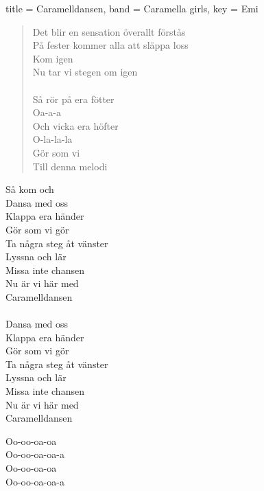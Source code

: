 \begin{song}[
	remember-chords = false ,
	verse/numbered = true ,
	transpose-capo = true 
	]{
		title = Caramelldansen,
		band = Caramella girls,
		key  = Emi
	}
\begin{verse}
		Det blir en sensation överallt förstås \\
		På fester kommer alla att släppa loss \\
		Kom igen \\
		Nu tar vi stegen om igen \\
		\\
		Så rör på era fötter \\
		Oa-a-a \\
		Och vicka era höfter \\
		O-la-la-la \\
		Gör som vi \\
		Till denna melodi \\

	\end{verse}
	\begin{chorus}
		
		Så kom och \\
		Dansa med oss \\
		Klappa era händer \\
		Gör som vi gör \\
		Ta några steg åt vänster \\
		Lyssna och lär \\
		Missa inte chansen \\
		Nu är vi här med \\
		Caramelldansen \\
		\\
		Dansa med oss \\
		Klappa era händer \\
		Gör som vi gör \\
		Ta några steg åt vänster \\
		Lyssna och lär \\
		Missa inte chansen \\
		Nu är vi här med \\
		Caramelldansen \\
		
	\end{chorus}
	\begin{verse*}
		
		Oo-oo-oa-oa \\
		Oo-oo-oa-oa-a \\
		Oo-oo-oa-oa \\ 
		Oo-oo-oa-oa-a \\
		
	\end{verse*}
	\begin{chorus}


\end{chorus}
\end{song}
